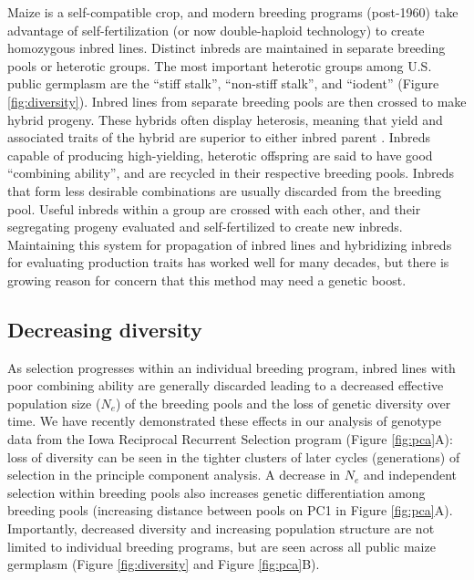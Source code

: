 \documentclass[12pt]{article}
\begin{document}
Maize is  a self-compatible crop, and modern breeding programs (post-1960) take advantage of self-fertilization (or now double-haploid technology) to create homozygous inbred lines. 
Distinct inbreds are maintained in separate breeding pools or heterotic groups.
The most important heterotic groups among U.S. public germplasm are the ``stiff stalk'', ``non-stiff stalk'', and ``iodent'' (Figure \ref{fig:diversity}).
Inbred lines from separate breeding pools are then crossed to make hybrid progeny.  
These hybrids often display heterosis, meaning that yield and associated traits of the hybrid are superior to  either inbred parent \citep{Springer:2007bj}.  
Inbreds capable of producing high-yielding, heterotic offspring are said to have good ``combining ability'', and are recycled in their respective breeding pools.
Inbreds that form less desirable combinations are usually discarded from the breeding pool. 
Useful inbreds within a group are crossed with each other, and their segregating progeny evaluated and self-fertilized to create new inbreds. 
Maintaining this system for propagation of inbred lines and hybridizing inbreds for evaluating production traits has worked well for many decades, but there is growing reason for concern that this method may need a genetic boost. 

\subsection*{Decreasing diversity} 

As selection progresses within an individual breeding program, inbred lines with poor combining ability are generally discarded leading to a decreased effective population size ($N_e$) of the breeding pools and the loss of genetic diversity over time.
We have recently demonstrated these effects in our analysis of genotype data from the Iowa Reciprocal Recurrent Selection program (Figure \ref{fig:pca}A):  loss of diversity can be seen in the tighter clusters of later cycles (generations) of selection in the principle component analysis.
A decrease in $N_e$ and independent selection within breeding pools also increases genetic differentiation among breeding pools (increasing distance between pools on PC1 in Figure \ref{fig:pca}A).
Importantly, decreased diversity and increasing population structure are not limited to individual breeding programs, but are seen across all public maize germplasm (Figure \ref{fig:diversity} and Figure \ref{fig:pca}B). 
\end{document}
